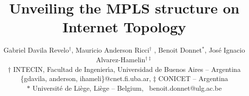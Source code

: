 \documentclass[conference]{IEEEtran} %
\begin{document}
\title{	Unveiling the MPLS structure on Internet Topology} %
\author{Gabriel Davila Revelo{$^{\dag}$}, Mauricio Anderson Ricci{$^{\dag}$} , Benoit Donnet{$^{\ast}$},
Jos\'e Ignacio Alvarez-Hamelin{$^{\dag\ddag}$}\\
$\dag$ INTECIN, Facultad de Ingenier\'{\i}a, Universidad de Buenos Aires -- Argentina\\ 
\{gdavila, anderson, ihameli\}@cnet.fi.uba.ar, $\ddag$ CONICET -- Argentina \\
$\ast$ Universit\'e de Li\`ege, Li\`ege -- Belgium,~ 
benoit.donnet@ulg.ac.be\\
}

\maketitle











{\small
 
 
}
\end{document}
